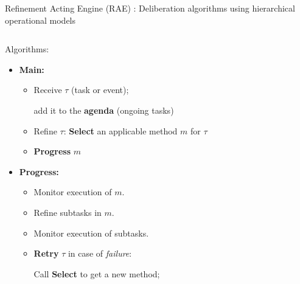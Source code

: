 \begin{frame}{Refinement Acting Engine (RAE)\cite{ghallabAutomatedPlanningActing2016} : Deliberation algorithms using hierarchical operational models}
    \begin{columns}[T]
  
        \begin{column}{0.65\textwidth}
            
            Algorithms:
            \small
            \begin{itemize}
                \setlength{\leftmargini}{-1pt}
                \item \textbf{Main:} 
                \begin{itemize}
                    \item Receive $\tau$ (task or event);
                    
                    add it to the \textbf{agenda} (ongoing tasks)
                    \item Refine $\tau$: \textbf{Select} an applicable method $m$ for $\tau$
                    \item \textbf{Progress} $m$
                \end{itemize}
                \item \textbf{Progress:}
                    \begin{itemize}
                        \item Monitor execution of $m$.
                        \item Refine subtasks in $m$.    
                        \item Monitor execution of subtasks.
                        \item \textbf{Retry} $\tau$ in case of \emph{failure}:
                    
                    Call \textbf{Select} to get a new method;
                    

\end{itemize}
\end{itemize}
\end{column}
\end{columns}
\end{frame}
